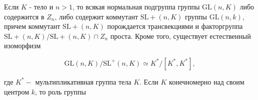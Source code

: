 \documentclass[10pt]{article}
\begin{document}
Если $K$ - тело и $n>1$, то всякая нормальная подгруппа группы $\mathrm{GL}(n, K)$ либо содержится в $Z_{n}$, либо содержит коммутант $\mathrm{SL}+(n, K)$ группы $\mathrm{GL}(n, k)$, причем коммутант $\mathrm{SL}+(n, K)$ порождается трансвекциями и факторгруппа $\mathrm{SL}+(n, K) / \mathrm{SL}+(n, K) \cap Z_{n}$ проста. Кроме того, существует естественный изоморфизм



\[

\mathrm{GL}(n, K) / \mathrm{SL}^{+}(n, K) \simeq K^{*} /\left[K^{*}, K^{*}\right],

\]



где $K^{*}-$ мультипликативная группа тела $K$. Если $K$ конечномерно над своим центром $k$, то роль группы
\end{document}
